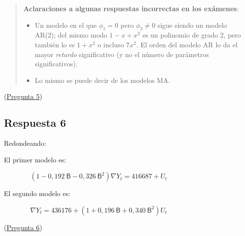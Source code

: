 \documentclass[10pt]{article}
\begin{document}
\begin{quote}
\textbf{Aclaraciones a algunas respuestas incorrectas en los exámenes}:

\begin{itemize}
\item Un modelo en el que \(\phi_1=0\) pero \(\phi_2\ne0\) sigue siendo un
modelo AR(2); del mismo modo \(1-x+x^2\) es un polinomio de grado 2,
pero también lo es \(1+x^2\) o incluso \(7x^2\). El orden del modelo AR
lo da el mayor \emph{retardo} significativo (y no el número de parámetros
significativos).

\item Lo mismo se puede decir de los modelos MA.
\end{itemize}
\end{quote}



(\hyperref[sec:org1e27c44]{Pregunta 5})
\subsection*{Respuesta 6}
\label{sec:orge4ce92a}

Redondeando:
\begin{description}
\item[{El primer modelo es:}] \(\quad(1-0,192\ \mathsf{B}-0,326\ \mathsf{B}^2)\nabla Y_t = 416687 +U_t\)

\item[{El segundo modelo es:}] \(\quad\nabla Y_t = 436176 + (1+0,196\ \mathsf{B}+0,340\ \mathsf{B}^2) U_t\)
\end{description}

(\hyperref[sec:orgfa3ef62]{Pregunta 6})
\end{document}
